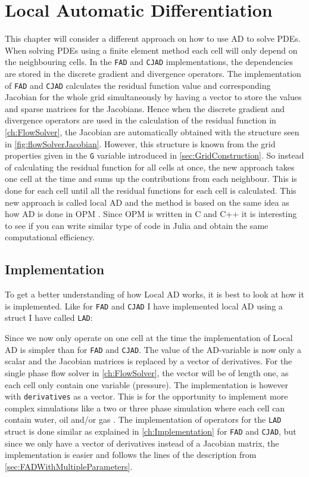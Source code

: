 \chapter{Local Automatic Differentiation}
\label{ch:LocalAD}
This chapter will consider a different approach on how to use AD to solve PDEs. When solving PDEs using a finite element method each cell will only depend on the neighbouring cells. In the \texttt{FAD} and \texttt{CJAD} implementations, the dependencies are stored in the discrete gradient and divergence operators. The implementation of \texttt{FAD} and \texttt{CJAD} calculates the residual function value and corresponding Jacobian for the whole grid simultaneously by having a vector to store the values and sparse matrices for the Jacobians. Hence when the discrete gradient and divergence operators are used in the calculation of the residual function in \autoref{ch:FlowSolver}, the Jacobian are automatically obtained with the structure seen in \autoref{fig:flowSolverJacobian}. However, this structure is known from the grid properties given in the \texttt{G} variable introduced in \autoref{sec:GridConstruction}. So instead of calculating the residual function for all cells at once, the new approach takes one cell at the time and sums up the contributions from each neighbour. This is done for each cell until all the residual functions for each cell is calculated. This new approach is called local AD and the method is based on the same idea as how AD is done in OPM \emph{\citep{OPM}}. Since OPM is written in C and C++ it is interesting to see if you can write similar type of code in Julia and obtain the same computational efficiency. 

\section{Implementation}
To get a better understanding of how Local AD works, it is best to look at how it is implemented. Like for \texttt{FAD} and \texttt{CJAD} I have implemented local AD using a struct I have called \texttt{LAD}:

Since we now only operate on one cell at the time the implementation of Local AD is simpler than for \texttt{FAD} and \texttt{CJAD}. The value of the AD-variable is now only a scalar and the Jacobian matrices is replaced by a vector of derivatives. For the single phase flow solver in \autoref{ch:FlowSolver}, the vector will be of length one, as each cell only contain one variable (pressure). The implementation is however with \texttt{derivatives} as a vector. This is for the opportunity to implement more complex simulations like a two or three phase simulation where each cell can contain water, oil and/or gas . The implementation of operators for the \texttt{LAD} struct is done similar as explained in \autoref{ch:Implementation} for \texttt{FAD} and \texttt{CJAD}, but since we only have a vector of derivatives instead of a Jacobian matrix, the implementation is easier and follows the lines of the description from \autoref{sec:FADWithMultipleParameters}. 

